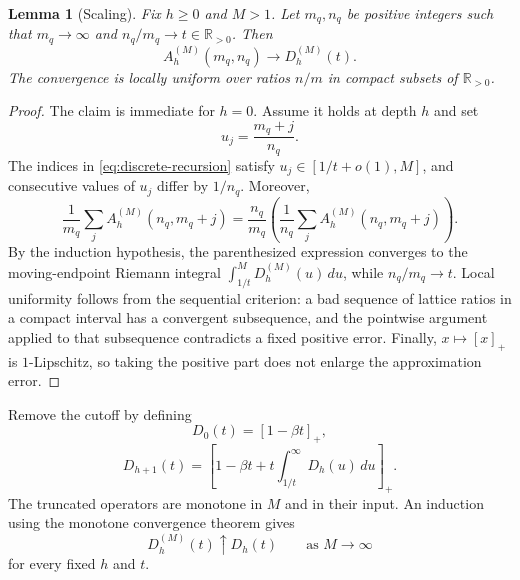 \documentclass[11pt,letterpaper]{article}
\newcommand{\cref}[1]{\autoref{#1}}
\newtheorem{lemma}[theorem]{Lemma}
\theoremstyle{definition}
\theoremstyle{remark}
\newcommand{\Rplus}{\mathbb{R}_{>0}}
\newcommand{\pos}[1]{\left[#1\right]_{+}}
\begin{document}
\begin{lemma}[Scaling]\label{lem:scaling}
Fix $h\ge0$ and $M>1$.
Let $m_q,n_q$ be positive integers such that $m_q\to\infty$ and $n_q/m_q\to t\in\Rplus$.
Then
\begin{equation}\label{eq:scaling-limit} A_h^{(M)}(m_q,n_q)\longrightarrow D_h^{(M)}(t). \end{equation}
The convergence is locally uniform over ratios $n/m$ in compact subsets of $\Rplus$.
\end{lemma}

\begin{proof}
The claim is immediate for $h=0$.
Assume it holds at depth $h$ and set
\begin{equation}\label{eq:riemann-coordinate} u_j=\frac{m_q+j}{n_q}. \end{equation}
The indices in \cref{eq:discrete-recursion} satisfy $u_j\in[1/t+o(1),M]$, and consecutive values of $u_j$ differ by $1/n_q$.
Moreover,
\begin{equation}\label{eq:riemann-factor} \frac{1}{m_q}\sum_jA_h^{(M)}(n_q,m_q+j)=\frac{n_q}{m_q}\left(\frac{1}{n_q}\sum_jA_h^{(M)}(n_q,m_q+j)\right). \end{equation}
By the induction hypothesis, the parenthesized expression converges to the moving-endpoint Riemann integral $\int_{1/t}^{M}D_h^{(M)}(u)\,du$, while $n_q/m_q\to t$.
Local uniformity follows from the sequential criterion: a bad sequence of lattice ratios in a compact interval has a convergent subsequence, and the pointwise argument applied to that subsequence contradicts a fixed positive error.
Finally, $x\mapsto\pos{x}$ is $1$-Lipschitz, so taking the positive part does not enlarge the approximation error.
\end{proof}

Remove the cutoff by defining
\begin{equation}\label{eq:continuous-base} D_0(t)=\pos{1-\beta t}, \end{equation}
\begin{equation}\label{eq:continuous-recursion} D_{h+1}(t)=\pos{1-\beta t+t\int_{1/t}^{\infty}D_h(u)\,du}. \end{equation}
The truncated operators are monotone in $M$ and in their input.
An induction using the monotone convergence theorem gives
\begin{equation}\label{eq:cutoff-limit} D_h^{(M)}(t)\uparrow D_h(t)\qquad\text{as }M\to\infty \end{equation}
for every fixed $h$ and $t$.
\end{document}
